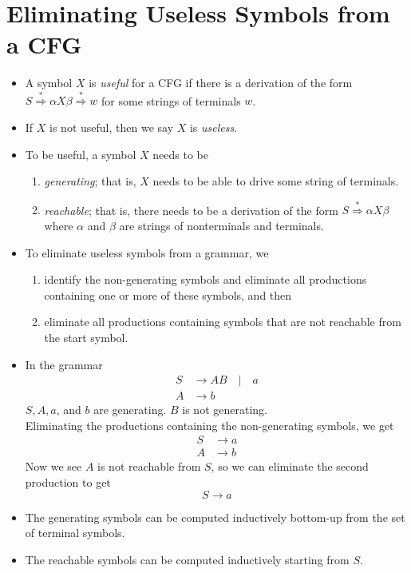 \documentclass[]{article}
\begin{document}
\section{Eliminating Useless Symbols from a CFG}
  \begin{itemize}
    \item A symbol $X$ is \emph{useful} for a CFG if there is a derivation of 
    the form $S \overset{*}{\Rightarrow} \alpha X\beta \overset{*}{\Rightarrow} 
    w$ for some strings of terminals $w$. 
    \item If $X$ is not useful, then we say $X$ is \emph{useless}.
    \item To be useful, a symbol $X$ needs to be
      \begin{enumerate}
        \item \emph{generating}; that is, $X$ needs to be able to drive some 
        string of terminals.
        \item \emph{reachable}; that is, there needs to be a derivation of the 
        form $S \overset{*}{\Rightarrow} \alpha{X}\beta$ where $\alpha$ and $\beta
        $ are strings of nonterminals and terminals.
      \end{enumerate}
    \item To eliminate useless symbols from a grammar, we
      \begin{enumerate}
        \item identify the non-generating symbols and eliminate all productions 
        containing one or more of these symbols, and then
        \item eliminate all productions containing symbols that are not reachable 
        from the start symbol.
      \end{enumerate}
    \item In the grammar
      \begin{align*}
        S &\rightarrow AB \quad | \quad a \\
        A &\rightarrow b
      \end{align*}
    $S,A,a$, and $b$ are generating. $B$ is not generating. \\
    Eliminating the productions containing the non-generating symbols, we get
      \begin{align*}
        S &\rightarrow a \\
        A &\rightarrow b
      \end{align*}
    Now we see $A$ is not reachable from $S$, so we can eliminate the second 
    production to get
      \[ S \rightarrow a \]
    \item The generating symbols can be computed inductively bottom-up from the 
    set of terminal symbols.
    \item The reachable symbols can be computed inductively starting from $S$.
  \end{itemize}
  
\end{document}
